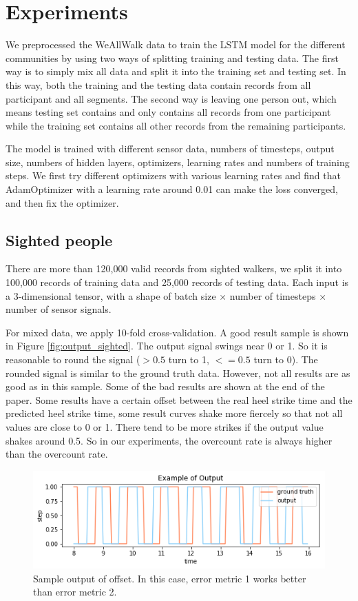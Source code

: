 \documentclass[11pt]{article}
\begin{document}
\section{Experiments}

We preprocessed the WeAllWalk data to train the LSTM model for the different communities by using two ways of splitting training and testing data. The first way is to simply mix all data and split it into the training set and testing set. In this way, both the training and the testing data contain records from all participant and all segments. The second way is leaving one person out, which means testing set contains and only contains all records from one participant while the training set contains all other records from the remaining participants.

The model is trained with different sensor data, numbers of timesteps, output size, numbers of hidden layers, optimizers, learning rates and numbers of training steps. We first try different optimizers with various learning rates and find that AdamOptimizer with a learning rate around 0.01 can make the loss converged, and then fix the optimizer. 


\subsection{Sighted people}
There are more than 120,000 valid records from sighted walkers, we split it into 100,000 records of training data and 25,000 records of testing data. Each input is a 3-dimensional tensor, with a shape of batch size $\times$ number of timesteps $\times$ number of sensor signals.

For mixed data, we apply 10-fold cross-validation. A good result sample is shown in Figure \ref{fig:output_sighted}. The output signal swings near 0 or 1. So it is reasonable to round the signal ($>0.5$ turn to 1, $<=0.5$ turn to 0). The rounded signal is similar to the ground truth data. However, not all results are as good as in this sample. Some of the bad results are shown at the end of the paper. Some results have a certain offset between the real heel strike time and the predicted heel strike time, some result curves shake more fiercely so that not all values are close to 0 or 1. There tend to be more strikes if the output value shakes around 0.5. So in our experiments, the overcount rate is always higher than the overcount rate.

\begin{figure}[ht]
\centering
\includegraphics[scale=0.4]{output_ex_offset}
\caption{Sample output of offset. In this case, error metric 1 works better than error metric 2.}
\label{fig:output_ex_offset}
\end{figure}
\end{document}
